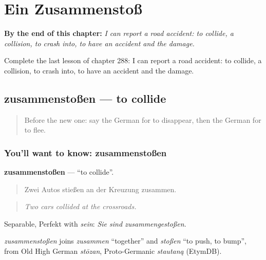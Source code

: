 
\chapter{Ein Zusammenstoß}
\label{ch:ge-ein-zusammensto}

\begin{chapteropening}
\textbf{By the end of this chapter:} \emph{I can report a road accident: to collide, a collision, to crash into, to have an accident and the damage.}

Complete the last lesson of chapter 288: I can report a road accident: to collide, a collision, to crash into, to have an accident and the damage.
\end{chapteropening}

\section[zusammenstoßen]{zusammenstoßen — to collide}

\label{lesson:GE-C288-zusammenstossen}



\begin{quote}
Before the new one: say the German for to disappear, then the German for to flee.
\end{quote}

\subsection*{You'll want to know: zusammenstoßen}
\textbf{zusammenstoßen} — \textquotedblleft{}to collide\textquotedblright{}.

\begin{quote}
Zwei Autos stießen an der Kreuzung zusammen.
\end{quote}

\begin{quote}
\emph{Two cars collided at the crossroads.}
\end{quote}

Separable, Perfekt with \emph{sein}: \emph{Sie sind zusammengestoßen}.

\begin{cousinweb}
\emph{zusammenstoßen} joins \emph{zusammen} \textquotedblleft{}together\textquotedblright{} and \emph{stoßen} \textquotedblleft{}to push, to bump\textquotedblright{}, from Old High German \emph{stōzan}, Proto-Germanic \emph{stautaną} (EtymDB).
\end{cousinweb}

